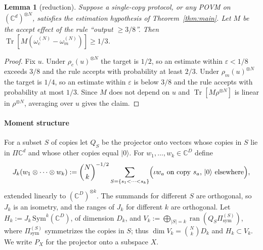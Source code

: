 \documentclass[pdflatex,sn-mathphys-num]{sn-jnl}%
\theoremstyle{thmstyleone}
\newtheorem{lemma}[theorem]{Lemma}
\theoremstyle{thmstylethree}
\theoremstyle{thmstyletwo}
\newcommand{\Tr}{\operatorname{Tr}}
\newcommand{\ran}{\operatorname{ran}}
\newcommand{\ket}[1]{|#1\rangle}
\newcommand{\sym}{\mathrm{sym}}
\newcommand{\C}{\mathbb{C}}
\begin{document}
\begin{lemma}[reduction]\label{lem:red}
Suppose a single-copy protocol, or any POVM on $(\C^d)^{\otimes N}$, satisfies the estimation hypothesis of
Theorem~\ref{thm:main}. Let $M$ be the accept effect of the rule ``output $\ge3/8$''. Then
$\Tr[M(\omega_c^{(N)}-\omega_m^{(N)})]\ge1/3$.
\end{lemma}
\begin{proof}
Fix $u$. Under $\rho_c(u)^{\otimes N}$ the target is $1/2$, so an estimate within $\varepsilon<1/8$ exceeds $3/8$ and
the rule accepts with probability at least $2/3$. Under $\rho_m(u)^{\otimes N}$ the target is $1/4$, so an estimate
within $\varepsilon$ is below $3/8$ and the rule accepts with probability at most $1/3$. Since $M$ does not depend on $u$
and $\Tr[M\rho^{\otimes N}]$ is linear in $\rho^{\otimes N}$, averaging over $u$ gives the claim.
\end{proof}

\paragraph{Moment structure} For a subset $S$ of copies let $Q_S$ be the projector onto vectors whose copies in $S$ lie
in $\Pi\C^d$ and whose other copies equal $\ket0$. For $w_1,\dots,w_k\in\C^D$ define
\[
J_k(w_1\otimes\cdots\otimes w_k):=\binom Nk^{-1/2}\sum_{S=\{s_1<\dots<s_k\}}\Bigl(\text{$\iota w_a$ on copy $s_a$,
$\ket0$ elsewhere}\Bigr),
\]
extended linearly to $(\C^D)^{\otimes k}$. The summands for different $S$ are orthogonal, so $J_k$ is an isometry, and
the ranges of $J_k$ for different $k$ are orthogonal. Let $H_k:=J_k\,\mathrm{Sym}^k(\C^D)$, of dimension $D_k$, and
$V_k:=\bigoplus_{|S|=k}\ran(Q_S\Pi_\sym^{(S)})$, where $\Pi_\sym^{(S)}$ symmetrizes the copies in $S$; thus $\dim
V_k=\binom Nk D_k$ and $H_k\subset V_k$. We write $P_X$ for the projector onto a subspace $X$.
\end{document}
